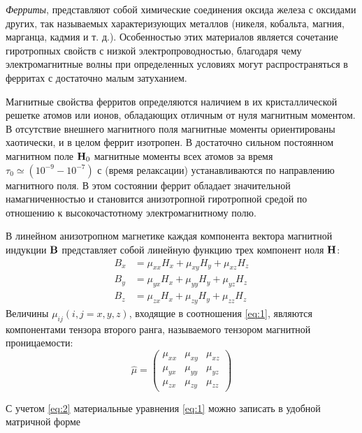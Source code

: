 \textit{Ферриты}, представляют собой химические соединения оксида железа с оксидами других, так называемых характеризующих
металлов (никеля, кобальта, магния, марганца, кадмия и т. д.). Особенностью этих материалов является сочетание
гиротропных свойств с низкой электропроводностью, благодаря чему электромагнитные волны при определенных условиях могут
распространяться в ферритах с достаточно малым затуханием.

Магнитные свойства ферритов определяются наличием в их кристаллической решетке атомов или ионов, обладающих отличным от
нуля магнитным моментом. В отсутствие внешнего магнитного поля магнитные моменты ориентированы хаотически, и в целом
феррит изотропен. В достаточно сильном постоянном магнитном поле $\textbf{H}_0$ магнитные моменты всех атомов за время
$\tau_0 \simeq (10^{-9} - 10^{-7})$ с (время релаксации) устанавливаются по направлению магнитного поля. В этом состоянии феррит обладает
значительной намагниченностью и становится анизотропной гиротропной средой по отношению к высокочастотному электромагнитному полю.

В линейном анизотропном магнетике каждая компонента вектора магнитной индукции $\textbf{B}$ представляет собой линейную функцию
трех компонент ноля $\textbf{H}$:
\begin{equation}
    \begin{aligned} 
        B_{x} &=\mu_{x x} H_{x}+\mu_{x y} H_{y}+\mu_{x z} H_{z} \\
        B_{y} &=\mu_{y x} H_{x}+\mu_{y y} H_{y}+\mu_{y z} H_{z} \\
        B_{z} &=\mu_{z x} H_{x}+\mu_{z y} H_{y}+\mu_{z z} H_{z}
    \end{aligned}
    \label{eq:1}
\end{equation}
Величины $\mu_{i j}(i,j=x,y,z)$, входящие в соотношения \eqref{eq:1}, являются компонентами тензора второго ранга, называемого
тензором магнитной проницаемости:
\begin{equation}
    \hat{\mu}=\left(\begin{array}
        {ccc}{\mu_{x x}} & {\mu_{x y}} & {\mu_{x z}} \\
        {\mu_{y x}} & {\mu_{y y}} & {\mu_{y z}} \\
        {\mu_{z x}} & {\mu_{z y}} & {\mu_{z z}}
    \end{array}\right)
    \label{eq:2}
\end{equation}


С учетом \eqref{eq:2} материальные уравнения \eqref{eq:1} можно записать в удобной матричной форме


